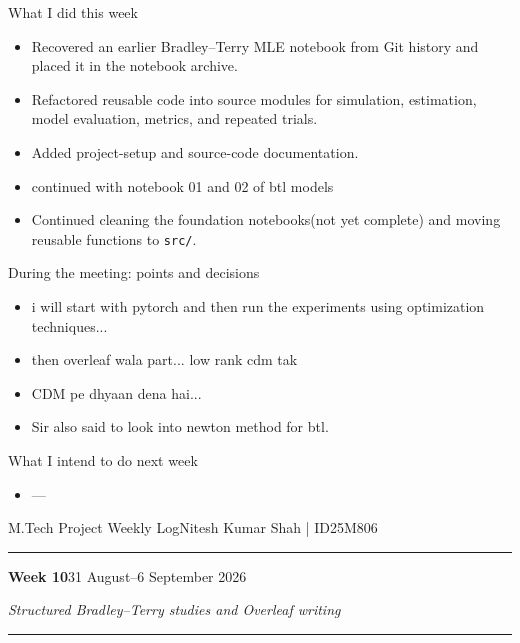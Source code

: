 \documentclass[10pt]{article}
\newcommand{\weekheading}[3]{%
  {\small M.Tech Project Weekly Log}\hfill{\small Nitesh Kumar Shah \;|\; ID25M806}\par
  \vspace{2pt}\hrule\vspace{7pt}
  {\Large\bfseries Week #1}\hfill{\normalsize #2}\par
  \vspace{2pt}
  {\itshape #3}\par
  \vspace{5pt}\hrule\vspace{7pt}
}
\begin{document}
\begin{weeklybox}{What I did this week}
  \begin{itemize}
    \item Recovered an earlier Bradley--Terry MLE notebook from Git history and placed it in the notebook archive.
    \item Refactored reusable code into source modules for simulation, estimation, model evaluation, metrics, and repeated trials.
    \item Added project-setup and source-code documentation.
    \item continued with notebook 01 and 02 of btl models
    \item Continued cleaning the foundation notebooks(not yet complete) and moving reusable functions to \texttt{src/}.
  \end{itemize}
\end{weeklybox}
\begin{weeklybox}{During the meeting: points and decisions}
  \small
  \begin{itemize}
    \item i will start with pytorch and then run the experiments using optimization techniques... 
    \item then overleaf wala part... low rank cdm tak 
    \item CDM pe dhyaan dena hai...
    \item Sir also said to look into newton method for btl.
  \end{itemize}
\end{weeklybox}

\begin{weeklybox}{What I intend to do next week}
  \small
  \begin{itemize}
    \item ---
  \end{itemize}
\end{weeklybox}




\newpage
\weekheading{10}{31 August--6 September 2026}{Structured Bradley--Terry studies and Overleaf writing}
\end{document}
